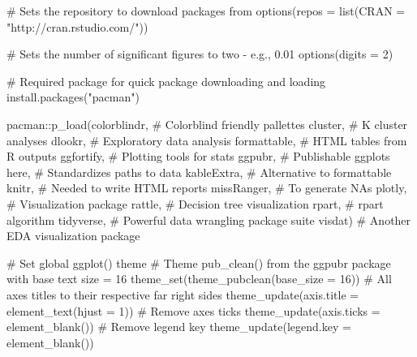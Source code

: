 \documentclass[
  letterpaper,
  DIV=11,
  numbers=noendperiod]{scrreprt}
\newenvironment{Shaded}{\begin{snugshade}}{\end{snugshade}}
\newcommand{\AttributeTok}[1]{\textcolor[rgb]{0.40,0.45,0.13}{#1}}
\newcommand{\CommentTok}[1]{\textcolor[rgb]{0.37,0.37,0.37}{#1}}
\newcommand{\DecValTok}[1]{\textcolor[rgb]{0.68,0.00,0.00}{#1}}
\newcommand{\FunctionTok}[1]{\textcolor[rgb]{0.28,0.35,0.67}{#1}}
\newcommand{\NormalTok}[1]{\textcolor[rgb]{0.00,0.23,0.31}{#1}}
\newcommand{\SpecialCharTok}[1]{\textcolor[rgb]{0.37,0.37,0.37}{#1}}
\newcommand{\StringTok}[1]{\textcolor[rgb]{0.13,0.47,0.30}{#1}}
\begin{document}
\begin{Shaded}
\begin{Highlighting}[]
\CommentTok{\# Sets the repository to download packages from}
\FunctionTok{options}\NormalTok{(}\AttributeTok{repos =} \FunctionTok{list}\NormalTok{(}\AttributeTok{CRAN =} \StringTok{"http://cran.rstudio.com/"}\NormalTok{))}

\CommentTok{\# Sets the number of significant figures to two {-} e.g., 0.01}
\FunctionTok{options}\NormalTok{(}\AttributeTok{digits =} \DecValTok{2}\NormalTok{)}

\CommentTok{\# Required package for quick package downloading and loading }
\FunctionTok{install.packages}\NormalTok{(}\StringTok{"pacman"}\NormalTok{)}

\NormalTok{pacman}\SpecialCharTok{::}\FunctionTok{p\_load}\NormalTok{(colorblindr, }\CommentTok{\# Colorblind friendly pallettes}
\NormalTok{               cluster, }\CommentTok{\# K cluster analyses}
\NormalTok{               dlookr, }\CommentTok{\# Exploratory data analysis}
\NormalTok{               formattable, }\CommentTok{\# HTML tables from R outputs}
\NormalTok{               ggfortify, }\CommentTok{\# Plotting tools for stats}
\NormalTok{               ggpubr, }\CommentTok{\# Publishable ggplots}
\NormalTok{               here, }\CommentTok{\# Standardizes paths to data}
\NormalTok{               kableExtra, }\CommentTok{\# Alternative to formattable}
\NormalTok{               knitr, }\CommentTok{\# Needed to write HTML reports}
\NormalTok{               missRanger, }\CommentTok{\# To generate NAs}
\NormalTok{               plotly, }\CommentTok{\# Visualization package}
\NormalTok{               rattle, }\CommentTok{\# Decision tree visualization}
\NormalTok{               rpart, }\CommentTok{\# rpart algorithm}
\NormalTok{               tidyverse, }\CommentTok{\# Powerful data wrangling package suite}
\NormalTok{               visdat) }\CommentTok{\# Another EDA visualization package}

\CommentTok{\# Set global ggplot() theme}
\CommentTok{\# Theme pub\_clean() from the ggpubr package with base text size = 16}
\FunctionTok{theme\_set}\NormalTok{(}\FunctionTok{theme\_pubclean}\NormalTok{(}\AttributeTok{base\_size =} \DecValTok{16}\NormalTok{)) }
\CommentTok{\# All axes titles to their respective far right sides}
\FunctionTok{theme\_update}\NormalTok{(}\AttributeTok{axis.title =} \FunctionTok{element\_text}\NormalTok{(}\AttributeTok{hjust =} \DecValTok{1}\NormalTok{))}
\CommentTok{\# Remove axes ticks}
\FunctionTok{theme\_update}\NormalTok{(}\AttributeTok{axis.ticks =} \FunctionTok{element\_blank}\NormalTok{()) }
\CommentTok{\# Remove legend key}
\FunctionTok{theme\_update}\NormalTok{(}\AttributeTok{legend.key =} \FunctionTok{element\_blank}\NormalTok{())}
\end{Highlighting}
\end{Shaded}
\end{document}

